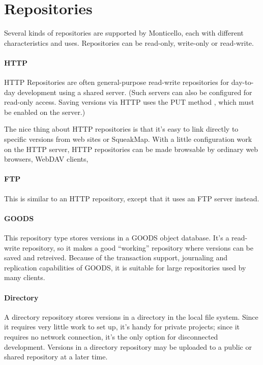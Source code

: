\documentclass[a4paper,10pt,twoside]{book}
\begin{document}
\section{Repositories}

Several kinds of repositories are supported by Monticello, each with different characteristics and uses. Repositories can be read-only, write-only or read-write.  

\paragraph{HTTP} HTTP Repositories are often general-purpose read-write repositories for day-to-day  development using a shared server. (Such servers can also be configured for read-only access. Saving versions via HTTP uses the PUT method , which must be enabled on the server.)

The nice thing about HTTP repositories is that it's easy to link directly to specific versions from web sites or SqueakMap. With a little configuration work on the HTTP server, HTTP repositories can be made browsable by ordinary web browsers, WebDAV clients, \etc
{}

\paragraph{FTP} This is similar to an HTTP repository, except that it uses an FTP server instead.  

\paragraph{GOODS} This repository type stores versions in a GOODS object database. It's a read-write repository, so it makes a good ``working'' repository where versions can be saved and retreived. Because of the transaction support, journaling and replication capabilities of GOODS, it is suitable for large repositories used by many clients.  

\paragraph{Directory} A directory repository stores versions in a directory in the local file system. Since it requires very little work to set up, it's handy for private projects; since it requires no network connection, it's the only option for disconnected development. Versions in a directory repository may be uploaded  to a public or shared repository at a later time. 
\end{document}
